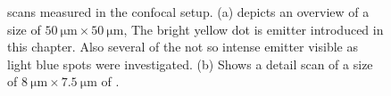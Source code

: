 	\begin{figure}[!htb]
		\begin{subfigure}{ 0.49\linewidth}
			\centering
			\caption{}
			\label{subfig::scan_1}
		\end{subfigure}
		\hfill
		\begin{subfigure}{ 0.49\linewidth}
			\centering
			\caption{}
			\label{subfig::scan_2}
		\end{subfigure}
		\caption[Confocal \pl scans]{\Pl scans measured in the confocal setup. (a) depicts an overview of a size of $\SI{50}{\micro\meter}\times\SI{50}{\micro\meter}$, The bright yellow dot is emitter \embroad introduced in this chapter. Also several of the not so intense emitter visible as light blue spots were investigated. (b) Shows a detail scan of a size of $\SI{8}{\micro\meter}\times\SI{7.5}{\micro\meter}$ of \embroad.}
		\label{fig::scans}
	\end{figure}

